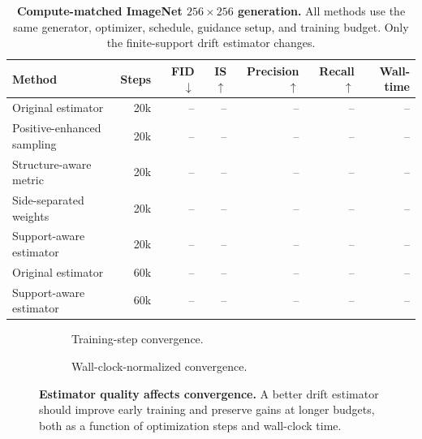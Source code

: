 \documentclass{article}
\newcommand{\placeholderbox}[2]{
\begin{center}
\fbox{
\begin{minipage}[c][#1][c]{0.92\linewidth}
\centering
\textcolor{mlgray}{#2}
\end{minipage}
}
\end{center}
}
\begin{document}
\begin{table}[h!]
\centering
\caption{
\textbf{Compute-matched ImageNet $256\times256$ generation.}
All methods use the same generator, optimizer, schedule, guidance setup, and training budget.
Only the finite-support drift estimator changes.
}
\label{tab:main_imagenet_results}
\begin{tabular}{lrrrrrr}
\toprule
Method & Steps & FID $\downarrow$ & IS $\uparrow$ & Precision $\uparrow$ & Recall $\uparrow$ & Wall-time \\
\midrule
Original estimator & 20k & -- & -- & -- & -- & -- \\
Positive-enhanced sampling & 20k & -- & -- & -- & -- & -- \\
Structure-aware metric & 20k & -- & -- & -- & -- & -- \\
Side-separated weights & 20k & -- & -- & -- & -- & -- \\
Support-aware estimator & 20k & -- & -- & -- & -- & -- \\
\midrule
Original estimator & 60k & -- & -- & -- & -- & -- \\
Support-aware estimator & 60k & -- & -- & -- & -- & -- \\
\bottomrule
\end{tabular}
\end{table}

\begin{figure}[h!]
\centering

\begin{subfigure}[t]{0.49\linewidth}
    \centering
    \placeholderbox{0.24\textheight}{
    Convergence curves.\\
    FID and IS versus training steps.\\
    Include baseline, positive-enhanced, best metric, side-separated, and full estimator when available.
    }
    \caption{Training-step convergence.}
    \label{fig:convergence_curves}
\end{subfigure}
\hfill
\begin{subfigure}[t]{0.49\linewidth}
    \centering
    \placeholderbox{0.24\textheight}{
    Wall-clock-normalized convergence.\\
    FID versus elapsed training time.\\
    Important for metrics with different computational cost.
    }
    \caption{Wall-clock-normalized convergence.}
    \label{fig:wallclock_convergence}
\end{subfigure}

\caption{
\textbf{Estimator quality affects convergence.}
A better drift estimator should improve early training and preserve gains at longer budgets, both as a function of optimization steps and wall-clock time.
}
\label{fig:convergence_combined}
\end{figure}
\end{document}
